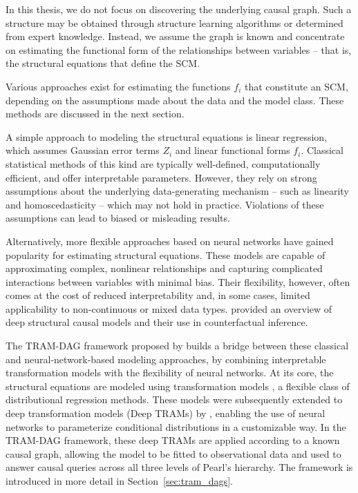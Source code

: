 In this thesis, we do not focus on discovering the underlying causal graph. Such a structure may be obtained through structure learning algorithms or determined from expert knowledge. Instead, we assume the graph is known and concentrate on estimating the functional form of the relationships between variables -- that is, the structural equations that define the SCM.

Various approaches exist for estimating the functions $f_i$ that constitute an SCM, depending on the assumptions made about the data and the model class. These methods are discussed in the next section.




%


A simple approach to modeling the structural equations is linear regression, which assumes Gaussian error terms $Z_i$ and linear functional forms $f_i$. Classical statistical methods of this kind are typically well-defined, computationally efficient, and offer interpretable parameters. However, they rely on strong assumptions about the underlying data-generating mechanism -- such as linearity and homoscedasticity -- which may not hold in practice. Violations of these assumptions can lead to biased or misleading results.

Alternatively, more flexible approaches based on neural networks have gained popularity for estimating structural equations. These models are capable of approximating complex, nonlinear relationships and capturing complicated interactions between variables with minimal bias. Their flexibility, however, often comes at the cost of reduced interpretability and, in some cases, limited applicability to non-continuous or mixed data types. \citet{poinsot2024} provided an overview of deep structural causal models and their use in counterfactual inference.

The TRAM-DAG framework proposed by \citet{sick2025} builds a bridge between these classical and neural-network-based modeling approaches, by combining interpretable transformation models with the flexibility of neural networks. At its core, the structural equations are modeled using transformation models \citep{hothorn2014}, a flexible class of distributional regression methods. These models were subsequently extended to deep transformation models (Deep TRAMs) by \citet{sick2020}, enabling the use of neural networks to parameterize conditional distributions in a customizable way. In the TRAM-DAG framework, these deep TRAMs are applied according to a known causal graph, allowing the model to be fitted to observational data and used to answer causal queries across all three levels of Pearl's hierarchy. The framework is introduced in more detail in Section~\ref{sec:tram_dags}.





